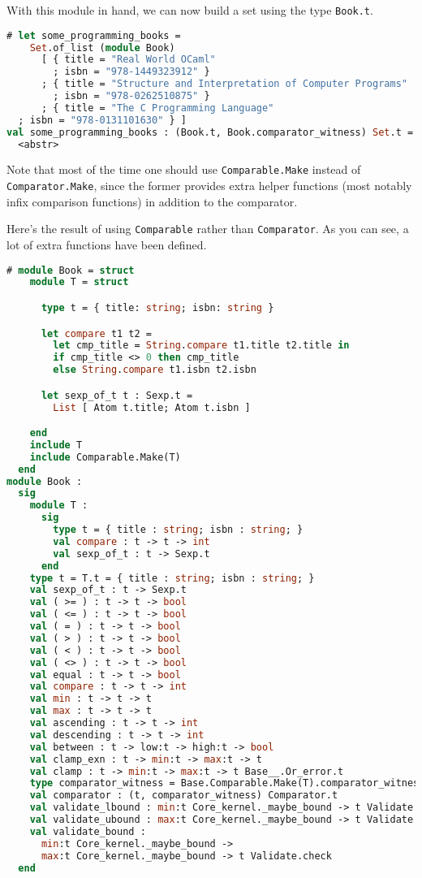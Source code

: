 With this module in hand, we can now build a set using the type
\passthrough{\lstinline!Book.t!}.

\begin{lstlisting}[language=Caml]
# let some_programming_books =
    Set.of_list (module Book)
      [ { title = "Real World OCaml"
        ; isbn = "978-1449323912" }
      ; { title = "Structure and Interpretation of Computer Programs"
        ; isbn = "978-0262510875" }
      ; { title = "The C Programming Language"
  ; isbn = "978-0131101630" } ]
val some_programming_books : (Book.t, Book.comparator_witness) Set.t =
  <abstr>
\end{lstlisting}

Note that most of the time one should use
\passthrough{\lstinline!Comparable.Make!} instead of
\passthrough{\lstinline!Comparator.Make!}, since the former provides
extra helper functions (most notably infix comparison functions) in
addition to the comparator.

Here's the result of using \passthrough{\lstinline!Comparable!} rather
than \passthrough{\lstinline!Comparator!}. As you can see, a lot of
extra functions have been defined.

\begin{lstlisting}[language=Caml]
# module Book = struct
    module T = struct

      type t = { title: string; isbn: string }

      let compare t1 t2 =
        let cmp_title = String.compare t1.title t2.title in
        if cmp_title <> 0 then cmp_title
        else String.compare t1.isbn t2.isbn

      let sexp_of_t t : Sexp.t =
        List [ Atom t.title; Atom t.isbn ]

    end
    include T
    include Comparable.Make(T)
  end
module Book :
  sig
    module T :
      sig
        type t = { title : string; isbn : string; }
        val compare : t -> t -> int
        val sexp_of_t : t -> Sexp.t
      end
    type t = T.t = { title : string; isbn : string; }
    val sexp_of_t : t -> Sexp.t
    val ( >= ) : t -> t -> bool
    val ( <= ) : t -> t -> bool
    val ( = ) : t -> t -> bool
    val ( > ) : t -> t -> bool
    val ( < ) : t -> t -> bool
    val ( <> ) : t -> t -> bool
    val equal : t -> t -> bool
    val compare : t -> t -> int
    val min : t -> t -> t
    val max : t -> t -> t
    val ascending : t -> t -> int
    val descending : t -> t -> int
    val between : t -> low:t -> high:t -> bool
    val clamp_exn : t -> min:t -> max:t -> t
    val clamp : t -> min:t -> max:t -> t Base__.Or_error.t
    type comparator_witness = Base.Comparable.Make(T).comparator_witness
    val comparator : (t, comparator_witness) Comparator.t
    val validate_lbound : min:t Core_kernel._maybe_bound -> t Validate.check
    val validate_ubound : max:t Core_kernel._maybe_bound -> t Validate.check
    val validate_bound :
      min:t Core_kernel._maybe_bound ->
      max:t Core_kernel._maybe_bound -> t Validate.check
  end
\end{lstlisting}


